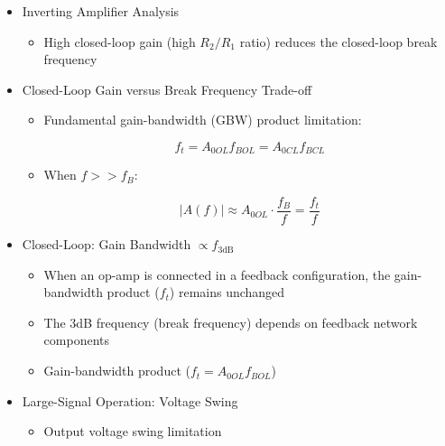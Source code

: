 \begin{itemize}
\begin{itemize}
    \end{itemize}

  \item Inverting Amplifier Analysis

    \begin{itemize}

      \item High closed-loop gain (high $R_2/R_1$ ratio) reduces the closed-loop break frequency

    \end{itemize}

  \item Closed-Loop Gain versus Break Frequency Trade-off

    \begin{itemize}

      \item Fundamental gain-bandwidth (GBW) product limitation:

        $$f_t=A_{0OL}f_{BOL}=A_{0CL}f_{BCL}$$

      \item When $f>>f_B$:

        $$|A(f)|\approx A_{0OL}\cdot\frac{f_B}{f}=\frac{f_t}{f}$$

    \end{itemize}

  \item Closed-Loop: Gain Bandwidth $\propto f_{3\text{dB}}$

    \begin{itemize}

      \item When an op-amp is connected in a feedback configuration, the gain-bandwidth product ($f_t$) remains unchanged

      \item The 3dB frequency (break frequency) depends on feedback network components

      \item Gain-bandwidth product ($f_t=A_{0OL}f_{BOL}$)

    \end{itemize}

  \item Large-Signal Operation: Voltage Swing

    \begin{itemize}

      \item Output voltage swing limitation

        \begin{itemize}


\end{itemize}
\end{itemize}
\end{itemize}
